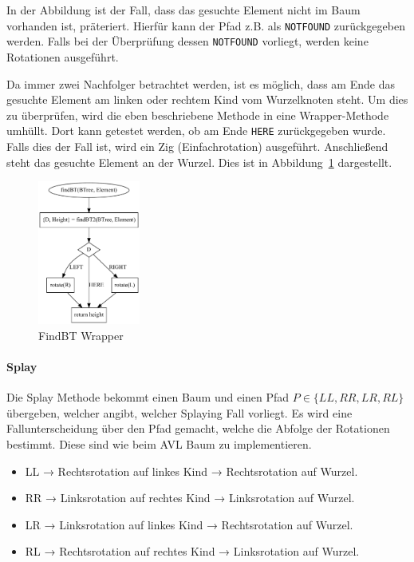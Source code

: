 In der Abbildung ist der Fall, dass das gesuchte Element nicht im Baum vorhanden ist, präteriert.
Hierfür kann der Pfad z.B. als \verb|NOTFOUND| zurückgegeben werden.
Falls bei der Überprüfung dessen \verb|NOTFOUND| vorliegt, werden keine Rotationen ausgeführt.

Da immer zwei Nachfolger betrachtet werden, ist es möglich, dass am Ende das gesuchte Element
am linken oder rechtem Kind vom Wurzelknoten steht.
Um dies zu überprüfen, wird die eben beschriebene Methode in eine Wrapper-Methode umhüllt.
Dort kann getestet werden, ob am Ende \verb|HERE| zurückgegeben wurde.
Falls dies der Fall ist, wird ein Zig (Einfachrotation) ausgeführt.
Anschließend steht das gesuchte Element an der Wurzel.
Dies ist in Abbildung~\ref{fig:splayFind2} dargestellt.
\begin{figure}[hbt]
    \centering
    \includegraphics[width=0.3\textwidth]{img/gv/splayFind}
    \caption{FindBT Wrapper}
    \label{fig:splayFind2}
\end{figure}

\paragraph{Splay}\label{par:splay}
Die Splay Methode bekommt einen Baum und einen Pfad \(P \in \{LL, RR, LR, RL\}\) übergeben,
welcher angibt, welcher Splaying Fall vorliegt.
Es wird eine Fallunterscheidung über den Pfad gemacht, welche die Abfolge der Rotationen bestimmt.
Diese sind wie beim AVL Baum zu implementieren.
\begin{itemize}
    \item LL → Rechtsrotation auf linkes Kind → Rechtsrotation auf Wurzel.
    \item RR → Linksrotation auf rechtes Kind → Linksrotation auf Wurzel.
    \item LR → Linksrotation auf linkes Kind → Rechtsrotation auf Wurzel.
    \item RL → Rechtsrotation auf rechtes Kind → Linksrotation auf Wurzel.
\end{itemize}

